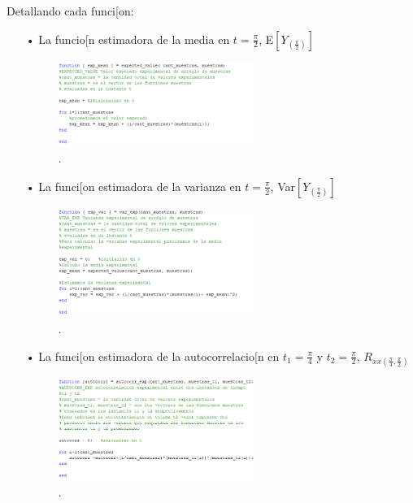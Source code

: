 Detallando cada funci[on:
\begin{enumerate}
\item[•] La funcio[n estimadora de la media en $t = \frac{\pi}{2}$, E$\left[ Y_{(\frac{\pi}{2})}\right]$
\begin{figure}[H]
\centering
	\includegraphics[width=0.6\textwidth, trim = {0 0 0 0},clip]{./ImagenesEjercicio1/expval.png}
	\caption{.}
	\label{fig:expval}
\end{figure}

\item[•] La funci[on estimadora de la varianza en $t = \frac{\pi}{2}$, Var$\left[Y_{(\frac{\pi}{2})}\right]$
\begin{figure}[H]
\centering
	\includegraphics[width=0.6\textwidth, trim = {0 0 0 0},clip]{./ImagenesEjercicio1/expvar.png}
	\caption{.}
	\label{fig:expvar}
\end{figure}

\item[•] La funci[on estimadora de la autocorrelacio[n en $t_1 = \frac{\pi}{4}$ y $t_2 = \frac{\pi}{2}$, $R_{xx(\frac{\pi}{4},\frac{\pi}{2})}$
\begin{figure}[H]
\centering
	\includegraphics[width=0.6\textwidth, trim = {0 0 0 0},clip]{./ImagenesEjercicio1/autocorr.png}
	\caption{.}
	\label{fig:autocorr}
\end{figure}


\end{enumerate}
